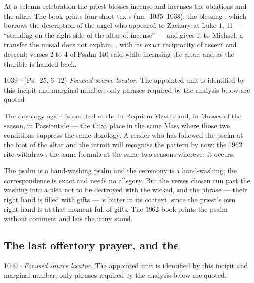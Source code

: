 At a solemn celebration the priest blesses incense and incenses the oblations
and the altar. The book prints four short texts (nn.~1035--1038): the blessing
, which borrows the description of the angel who appeared to
Zachary at Luke 1, 11 --- ``standing on the right side of the altar of
incense'' --- and gives it to Michael, a transfer the missal does not explain;
, with its exact reciprocity of ascent
and descent; verses 2 to 4 of Psalm 140 said while incensing the altar; and
 as the thurible is handed back.

\begin{appointed}{1039 $\cdot$  (Ps.~25, 6--12)}
\textit{Focused source locator.} The appointed unit is identified by this incipit and marginal number; only phrases required by the analysis below are quoted.
\end{appointed}

\begin{rubricnote}{The doxology again}
 is omitted at the  in Requiem Masses
and, in Masses of the season, in Passiontide --- the third place in the same
Mass where those two conditions suppress the same doxology. A reader who has
followed the psalm at the foot of the altar and the introit will recognise the
pattern by now: the 1962 rite withdraws the same formula at the same two
seasons wherever it occurs.
\end{rubricnote}

The psalm is a hand-washing psalm and the ceremony is a hand-washing; the
correspondence is exact and needs no allegory. But the verses chosen run past
the washing into a plea not to be destroyed with the wicked, and the phrase
 --- their right hand is filled
with gifts --- is bitter in its context, since the priest's own right hand is
at that moment full of gifts. The 1962 book prints the psalm without comment
and lets the irony stand.

\subsection*{The last offertory prayer, and the }

\begin{appointed}{1040 $\cdot$ }
\textit{Focused source locator.} The appointed unit is identified by this incipit and marginal number; only phrases required by the analysis below are quoted.
\end{appointed}

